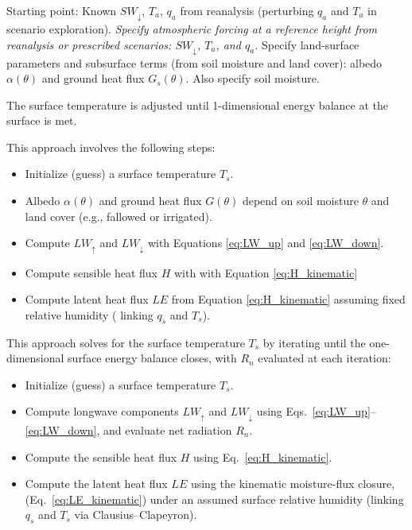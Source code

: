 \documentclass{article}
\begin{document}
    Starting point: 
    Known $SW_\downarrow$, $T_a$, $q_a$ from reanalysis (perturbing $q_a$ and $T_a$ in scenario exploration). 
    \textit{Specify atmospheric forcing at a reference height from reanalysis or prescribed scenarios: $SW_{\downarrow}$, $T_a$, and $q_a$.}
    Specify land-surface parameters and subsurface terms (from soil moisture and land cover): albedo $\alpha(\theta)$ and ground heat flux $G_s(\theta)$. Also specify soil moisture. 

    The  surface temperature is adjusted until 1-dimensional energy balance at the surface is met. 

    This approach involves the following steps:

    \begin{itemize}
        \item Initialize (guess) a surface temperature $T_s$.
        \item    Albedo $\alpha(\theta)$ and ground heat flux $G(\theta)$ depend on soil moisture $\theta$ and land cover (e.g.,  fallowed or irrigated). 
        \item   Compute $LW_\uparrow$  and $LW_\downarrow$ with Equations \ref{eq:LW_up}  and \ref{eq:LW_down}.
        \item  Compute sensible heat flux $H$ with with Equation \ref{eq:H_kinematic}
        \item Compute latent heat flux $LE$ from Equation \ref{eq:H_kinematic} assuming fixed relative humidity ( linking $q_s$ and $T_s$).  
        \end{itemize} 

    This approach solves for the surface temperature $T_s$ by iterating until the one-dimensional surface energy balance closes, with $R_n$ evaluated at each iteration:

    \begin{itemize}
        \item Initialize (guess) a surface temperature $T_s$.
        \item Compute longwave components $LW_{\uparrow}$ and $LW_{\downarrow}$ using Eqs.~\ref{eq:LW_up}--\ref{eq:LW_down}, and evaluate net radiation $R_n$.
        \item Compute the sensible heat flux $H$ using Eq.~\ref{eq:H_kinematic}.
        \item Compute the latent heat flux $LE$ using  the kinematic moisture-flux closure, (Eq.~\ref{eq:LE_kinematic}) under an assumed surface relative humidity (linking $q_s$ and $T_s$ via Clausius--Clapeyron).
    \end{itemize}
\end{document}
